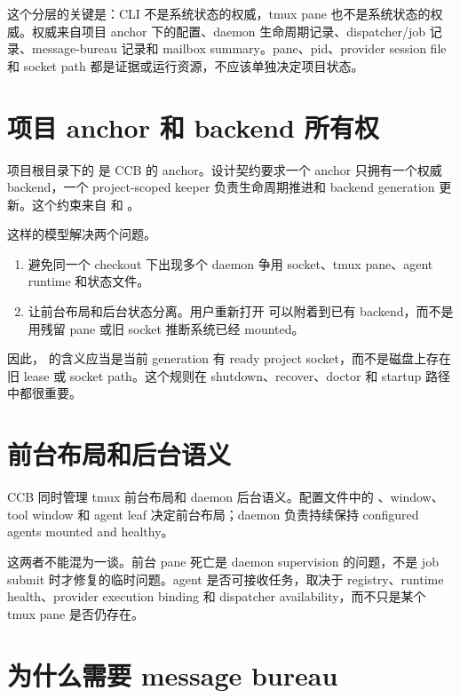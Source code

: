 这个分层的关键是：CLI 不是系统状态的权威，tmux pane 也不是系统状态的权威。权威来自项目 anchor 下的配置、daemon 生命周期记录、dispatcher/job 记录、message-bureau 记录和 mailbox summary。pane、pid、provider session file 和 socket path 都是证据或运行资源，不应该单独决定项目状态。

\section{项目 anchor 和 backend 所有权}

项目根目录下的  是 CCB 的 anchor。设计契约要求一个  anchor 只拥有一个权威  backend，一个 project-scoped keeper 负责生命周期推进和 backend generation 更新。这个约束来自  和 。

这样的模型解决两个问题。

\begin{enumerate}
  \item 避免同一个 checkout 下出现多个 daemon 争用 socket、tmux pane、agent runtime 和状态文件。
  \item 让前台布局和后台状态分离。用户重新打开  可以附着到已有 backend，而不是用残留 pane 或旧 socket 推断系统已经 mounted。
\end{enumerate}

因此， 的含义应当是当前 generation 有 ready project socket，而不是磁盘上存在旧 lease 或 socket path。这个规则在 shutdown、recover、doctor 和 startup 路径中都很重要。

\section{前台布局和后台语义}

CCB 同时管理 tmux 前台布局和 daemon 后台语义。配置文件中的 、window、tool window 和 agent leaf 决定前台布局；daemon 负责持续保持 configured agents mounted and healthy。

这两者不能混为一谈。前台 pane 死亡是 daemon supervision 的问题，不是 job submit 时才修复的临时问题。agent 是否可接收任务，取决于 registry、runtime health、provider execution binding 和 dispatcher availability，而不只是某个 tmux pane 是否仍存在。

\section{为什么需要 message bureau}

